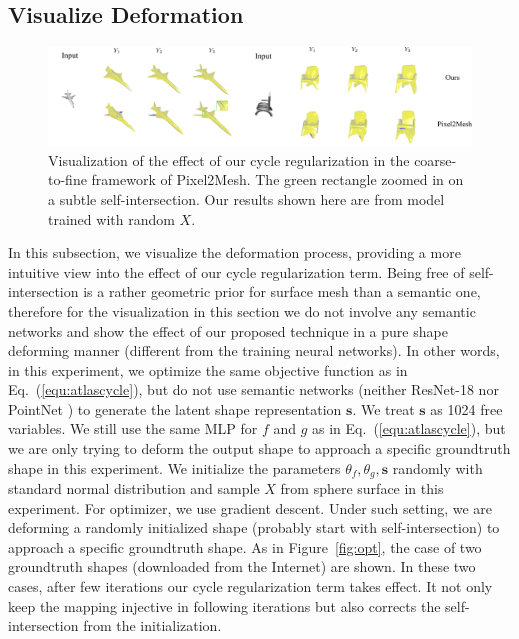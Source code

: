\subsection{Visualize Deformation}
\label{subsec:deform}
\begin{figure}
	\centering
	\includegraphics[width=\textwidth]{img/p2m/3level}
	\caption{Visualization of the effect of our cycle regularization in the coarse-to-fine framework of Pixel2Mesh. The green rectangle zoomed in on a subtle self-intersection. Our results shown here are from model trained with random $X$.}
	\label{fig:3level}
\end{figure}
In this subsection, we visualize the deformation process, providing a more intuitive view into the effect of our cycle regularization term. Being free of self-intersection is a rather geometric prior for surface mesh than a semantic one, therefore for the visualization in this section we do not involve any semantic networks and show the effect of our proposed technique in a pure shape deforming manner (different from the training neural networks). In other words, in this experiment, we optimize the same objective function as in Eq.~(\ref{equ:atlascycle}), but do not use semantic networks (neither ResNet-18 \cite{resnet} nor PointNet \cite{pointnet}) to generate the latent shape representation $\mathbf{s}$. We treat $\mathbf{s}$ as 1024 free variables.  We still use the same MLP for $f$ and $g$ as in Eq.~(\ref{equ:atlascycle}), but we are only trying to deform the output shape to approach a specific groundtruth shape in this experiment. We initialize the parameters $\theta_f,\theta_g,\mathbf{s}$ randomly with standard normal distribution and sample $X$ from sphere surface in this experiment. For optimizer, we use gradient descent. Under such setting, we are deforming a randomly initialized shape (probably start with self-intersection) to approach a specific groundtruth shape. As in Figure~\ref{fig:opt}, the case of two groundtruth shapes (downloaded from the Internet) are shown. In these two cases, after few iterations our cycle regularization term takes effect. It not only keep the mapping injective in following iterations but also corrects the self-intersection from the initialization.

